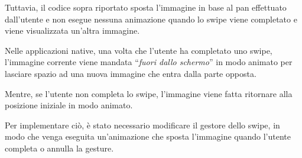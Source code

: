 \vspace{1em}
Tuttavia, il codice sopra riportato sposta l'immagine in base al pan effettuato dall'utente e non esegue nessuna animazione quando lo swipe viene completato e viene visualizzata un'altra immagine.

Nelle applicazioni native, una volta che l'utente ha completato uno swipe, l'immagine corrente viene mandata ``\textit{fuori dallo schermo}'' in modo animato per lasciare spazio ad una nuova immagine che entra dalla parte opposta.

Mentre, se l'utente non completa lo swipe, l'immagine viene fatta ritornare alla posizione iniziale in modo animato.

Per implementare ciò, è stato necessario modificare il gestore dello swipe, in modo che venga eseguita un'animazione che sposta l'immagine quando l'utente completa o annulla la gesture.

